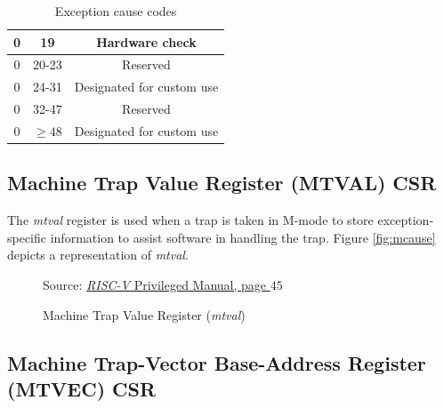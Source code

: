 \begin{table}
\begin{tabular}{|c|c|c|}
    \hline
    0                      & 19            & Hardware check                 \\
    \hline
    0                      & 20-23         & Reserved                       \\
    \hline
    0                      & 24-31         & Designated for custom use      \\
    \hline
    0                      & 32-47         & Reserved                       \\
    \hline
    0                      & $\geq 48$     & Designated for custom use      \\
    \hline
  \end{tabular}
  \caption{Exception cause codes}
  \label{tab:exceptioncauses}
\end{table}

\subsection{Machine Trap Value Register (MTVAL) CSR}
\label{subsec:riscv_mtval}

The \textit{mtval} register is used when a trap is taken in M-mode to store
exception-specific information to assist software in handling the trap. Figure \ref{fig:mcause}
depicts a representation of \textit{mtval}. \\
\begin{figure}[H]
  \centering
  \def\stackalignment{r} %
  {\scriptsize Source: \href{https://drive.google.com/file/d/17GeetSnT5wW3xNuAHI95-SI1gPGd5sJ_/view}{\textit{RISC-V} Privileged Manual, page $45$}}
  \caption{Machine Trap Value Register (\textit{mtval})}
  \label{fig:mtval}
\end{figure}

\subsection{Machine Trap-Vector Base-Address Register (MTVEC) CSR}
\label{subsec:riscv_mtvec}

